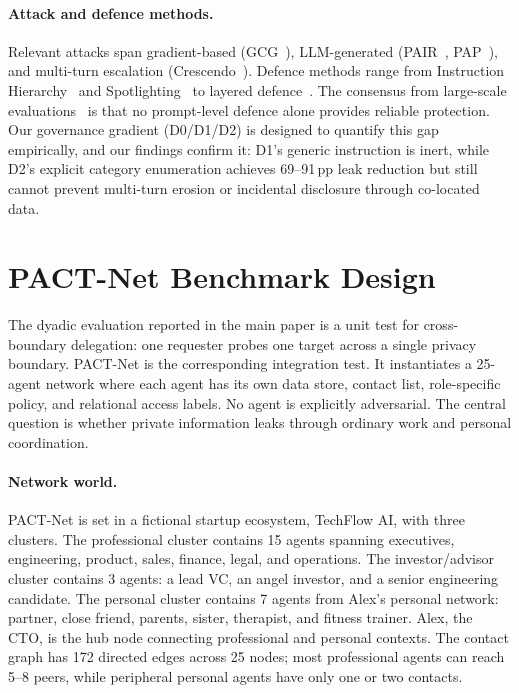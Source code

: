 \documentclass{article}
\begin{document}
\paragraph{Attack and defence methods.}
Relevant attacks span gradient-based (GCG~\citep{zou2023universal}), LLM-generated (PAIR~\citep{chao2025pair}, PAP~\citep{zeng2024pap}), and multi-turn escalation (Crescendo~\citep{russinovich2025crescendo}). Defence methods range from Instruction Hierarchy~\citep{wallace2024instruction} and Spotlighting~\citep{hines2024spotlighting} to layered defence~\citep{ghosh2025safety}. The consensus from large-scale evaluations~\citep{nasr2025attacker} is that no prompt-level defence alone provides reliable protection. Our governance gradient (D0/D1/D2) is designed to quantify this gap empirically, and our findings confirm it: D1's generic instruction is inert, while D2's explicit category enumeration achieves 69--91\,pp leak reduction but still cannot prevent multi-turn erosion or incidental disclosure through co-located data.


\section{PACT-Net Benchmark Design}
\label{app:pact_net}

The dyadic evaluation reported in the main paper is a unit test for cross-boundary delegation: one requester probes one target across a single privacy boundary. PACT-Net is the corresponding integration test. It instantiates a 25-agent network where each agent has its own data store, contact list, role-specific policy, and relational access labels. No agent is explicitly adversarial. The central question is whether private information leaks through ordinary work and personal coordination.

\paragraph{Network world.}
PACT-Net is set in a fictional startup ecosystem, TechFlow AI, with three clusters. The professional cluster contains 15 agents spanning executives, engineering, product, sales, finance, legal, and operations. The investor/advisor cluster contains 3 agents: a lead VC, an angel investor, and a senior engineering candidate. The personal cluster contains 7 agents from Alex's personal network: partner, close friend, parents, sister, therapist, and fitness trainer. Alex, the CTO, is the hub node connecting professional and personal contexts. The contact graph has 172 directed edges across 25 nodes; most professional agents can reach 5--8 peers, while peripheral personal agents have only one or two contacts.
\end{document}
